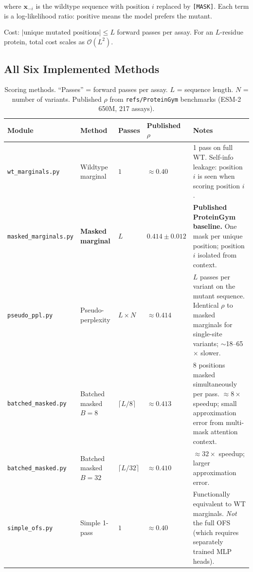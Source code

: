 \documentclass[11pt,a4paper]{article}
\begin{document}
where $\mathbf{x}_{-i}$ is the wildtype sequence with position $i$ replaced
by \texttt{[MASK]}.  Each term is a log-likelihood ratio: positive means the
model prefers the mutant.

Cost: $|\text{unique mutated positions}| \leq L$ forward passes per assay.
For an $L$-residue protein, total cost scales as $\mathcal{O}(L^2)$.

\subsection{All Six Implemented Methods}

\begin{table}[ht]
\centering
\caption{Scoring methods. ``Passes'' = forward passes per assay. $L$ = sequence
length. $N$ = number of variants. Published $\rho$ from
\texttt{refs/ProteinGym} benchmarks (ESM-2 650M, 217 assays).}
\label{tab:methods}
\begin{tabular}{llllp{5.2cm}}
\toprule
Module & Method & Passes & Published $\rho$ & Notes \\
\midrule
\texttt{wt\_marginals.py}
  & Wildtype marginal
  & $1$
  & ${\approx}0.40$
  & 1 pass on full WT. Self-info leakage: position $i$ is seen when scoring position $i$. \\[4pt]
\texttt{masked\_marginals.py}
  & \textbf{Masked marginal}
  & $L$
  & $\mathbf{0.414 \pm 0.012}$
  & \textbf{Published ProteinGym baseline.} One mask per unique position; position $i$ isolated from context. \\[4pt]
\texttt{pseudo\_ppl.py}
  & Pseudo-perplexity
  & $L \times N$
  & ${\approx}0.414$
  & $L$ passes per variant on the mutant sequence. Identical $\rho$ to masked marginals for single-site variants; $\sim$18--65$\times$ slower. \\[4pt]
\texttt{batched\_masked.py}
  & Batched masked $B{=}8$
  & $\lceil L/8 \rceil$
  & ${\approx}0.413$
  & 8 positions masked simultaneously per pass. ${\approx}8\times$ speedup; small approximation error from multi-mask attention context. \\[4pt]
\texttt{batched\_masked.py}
  & Batched masked $B{=}32$
  & $\lceil L/32 \rceil$
  & ${\approx}0.410$
  & ${\approx}32\times$ speedup; larger approximation error. \\[4pt]
\texttt{simple\_ofs.py}
  & Simple 1-pass
  & $1$
  & ${\approx}0.40$
  & Functionally equivalent to WT marginals. \emph{Not} the full OFS~\cite{kantroo2024ofs} (which requires separately trained MLP heads). \\
\bottomrule
\end{tabular}
\end{table}
\end{document}
